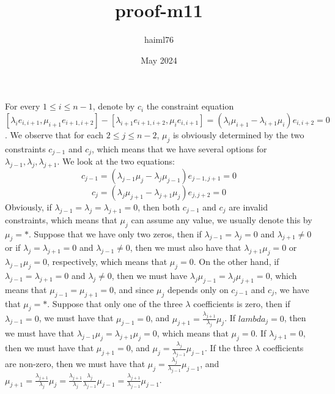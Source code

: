 \documentclass{article}
\title{proof-m11}
\author{haiml76 }
\date{May 2024}
\begin{document}
For every $1\leq i\leq n-1$, denote by $c_i$ the constraint equation $[\lambda_i e_{i,i+1},\mu_{i+1}e_{i+1,i+2}]-[\lambda_{i+1}e_{i+1,i+2},\mu_i e_{i,i+1}]=(\lambda_i\mu_{i+1}-\lambda_{i+1}\mu_i)e_{i,i+2}=0$. We observe that for each $2\leq j\leq n-2$, $\mu_j$ is obviously determined by the two constraints $c_{j-1}$ and $c_j$, which means that we have several options for $\lambda_{j-1},\lambda_j,\lambda_{j+1}$. We look at the two equations: \[
c_{j-1}=(\lambda_{j-1}\mu_j-\lambda_j\mu_{j-1})e_{j-1,j+1}=0
\]\[
c_j=(\lambda_j\mu_{j+1}-\lambda_{j+1}\mu_j)e_{j,j+2}=0
\]
Obviously, if $\lambda_{j-1}=\lambda_j=\lambda_{j+1}=0$, then both $c_{j-1}$ and $c_j$ are invalid constraints, which means that $\mu_j$ can assume any value, we usually denote this by $\mu_j=\ast$.
Suppose that we have only two zeros, then if $\lambda_{j-1}=\lambda_j=0$ and $\lambda_{j+1}\neq 0$ or if $\lambda_j=\lambda_{j+1}=0$ and $\lambda_{j-1}\neq 0$, then we must also have that $\lambda_{j+1}\mu_j=0$ or $\lambda_{j-1}\mu_j=0$, respectively, which means that $\mu_j=0$. On the other hand, if $\lambda_{j-1}=\lambda_{j+1}=0$ and $\lambda_j\neq 0$, then we must have $
\lambda_j\mu_{j-1}=\lambda_j\mu_{j+1}=0$, which means that $\mu_{j-1}=\mu_{j+1}=0$, and since $\mu_j$ depends only on $c_{j-1}$ and $c_j$, we have that $\mu_j=\ast$.
Suppose that only one of the three $\lambda$ coefficients is zero, then if $\lambda_{j-1}=0$, we must have that $\mu_{j-1}=0$, and $\mu_{j+1}=\frac{\lambda_{j+1}}{\lambda_j}\mu_j$. If $lambda_j=0$, then we must have that $\lambda_{j-1}\mu_j=\lambda_{j+1}\mu_j=0$, which means that $\mu_j=0$. If $\lambda_{j+1}=0$, then we must have that $\mu_{j+1}=0$, and $\mu_j=\frac{\lambda_j}{\lambda_{j-1}}\mu_{j-1}$. If the three $\lambda$ coefficients are non-zero, then we must have that $\mu_j=\frac{\lambda_j}{\lambda_{j-1}}\mu_{j-1}$, and $\mu_{j+1}=\frac{\lambda_{j+1}}{\lambda_j}\mu_j=\frac{\lambda_{j+1}}{\lambda_j}\frac{\lambda_j}{\lambda_{j-1}}\mu_{j-1}=\frac{\lambda_{j+1}}{\lambda_{j-1}}\mu_{j-1}$.
\end{document}

